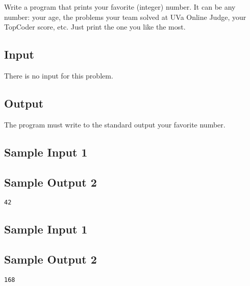 

Write a program that prints your favorite (integer) number. It can be any number: your age, the problems your team solved at UVa Online Judge, your TopCoder score, etc. Just print the one you like the most.

\subsection*{Input}

There is no input for this problem.

\subsection*{Output}

The program must write to the standard output your favorite number.

\subsection*{Sample Input 1}

\subsection*{Sample Output 2}

\begin{verbatim}
42
\end{verbatim}

\subsection*{Sample Input 1}

\subsection*{Sample Output 2}

\begin{verbatim}
168
\end{verbatim}
